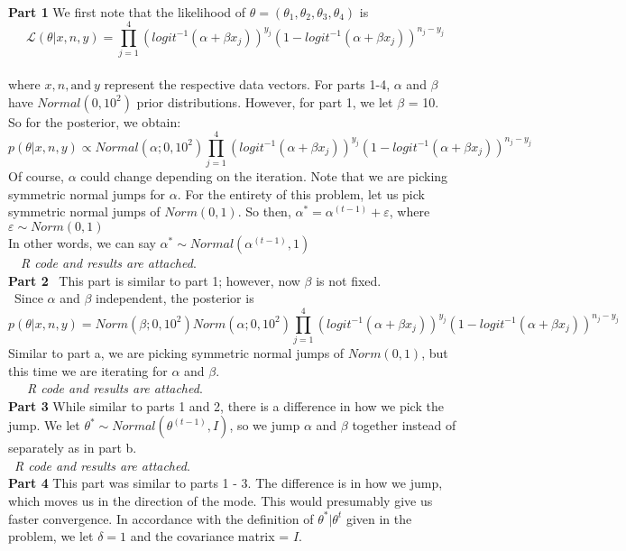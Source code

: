 \documentclass[10pt,a4paper]{article}
\begin{document}
\begin{problem}{5}
\text{ }\\
\textbf{Part 1} We first note that the likelihood of $\theta=(\theta_1,\theta_2,\theta_3,\theta_4)$ is
$$\mathcal{L}(\theta|x,n,y)=\prod_{j=1}^{4}(logit^{-1}(\alpha+\beta x_j))^{y_j}(1-logit^{-1}(\alpha+\beta x_j))^{n_j-y_j} $$\\
where $x, n, \textrm{and}\ y$ represent the respective data vectors. For parts 1-4, $\alpha$ and $\beta$have $Normal(0,10^2)$ prior distributions. However, for part 1, we let $\beta$ = 10.\\
So for the posterior, we obtain:
$$p(\theta|x,n,y)\propto Normal(\alpha;0,10^2)\prod_{j=1}^{4}(logit^{-1}(\alpha+\beta x_j))^{y_j}(1-logit^{-1}(\alpha+\beta x_j))^{n_j-y_j}$$
Of course, $\alpha$ could change depending on the iteration. Note that we are picking symmetric normal jumps for $\alpha$. For the entirety of this problem, let us pick symmetric normal jumps of $Norm(0,1)$. So then, $\alpha^{*}=\alpha^{(t-1)}+\varepsilon$, where $\varepsilon\sim Norm(0,1)$\\ 
In other words, we can say $\alpha^{*}\sim Normal(\alpha^{(t-1)},1)$\\
\ \ \textit{R code and results are attached}. \\
\textbf{Part 2} \ This part is similar to part 1; however, now $\beta$ is not fixed. 
\\\
Since $\alpha$ and $\beta$ independent, the posterior is \\
$$p(\theta|x,n,y)=Norm(\beta;0,10^2)Norm(\alpha;0,10^2)\prod_{j=1}^{4}(logit^{-1}(\alpha+\beta x_j))^{y_j}(1-logit^{-1}(\alpha+\beta x_j))^{n_j-y_j}$$
Similar to part a, we are picking symmetric normal jumps of $Norm(0,1)$, but this time we are iterating for $\alpha$ and $\beta$.  
\\\
\ \ \textit{R code and results are attached}.
\\
\textbf{Part 3} While similar to parts 1 and 2, there is a difference in how we pick the jump. We let $\theta^{*}\sim Normal(\theta^{(t-1)},I)$, so we jump $\alpha$ and $\beta$ together instead of separately as in part b.
\\\
\textit{R code and results are attached}.\\
\textbf{Part 4} This part was similar to parts 1 - 3. The difference is in how we jump, which moves us in the direction of the mode. This would presumably give us faster convergence. In accordance with the definition of $\theta^{*}|\theta^{t}$ given in the problem, we let $\delta=1$ and the covariance matrix = $I$.

\end{problem}
\end{document}

